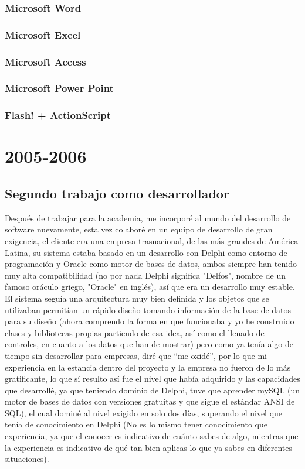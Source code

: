 \documentclass[12pt,spanish,lettersize]{book}
\begin{document}
\subsection{Microsoft Word}
\subsection{Microsoft Excel}
\subsection{Microsoft Access}
\subsection{Microsoft Power Point}
\subsection{Flash! + ActionScript}
\chapter{2005-2006}
\section{Segundo trabajo como desarrollador}

Después de trabajar para la academia, me incorporé al mundo del desarrollo de software nuevamente, esta vez colaboré en un equipo de desarrollo de gran exigencia, el cliente era una empresa trasnacional, de las más grandes de América Latina, su sistema estaba basado en un desarrollo con Delphi como entorno de programación y Oracle como motor de bases de datos, ambos siempre han tenido muy alta compatibilidad (no por nada Delphi significa "Delfos", nombre de un famoso oráculo griego, "Oracle" en inglés), así que era un desarrollo muy estable.\\

El sistema seguía una arquitectura muy bien definida y los objetos que se utilizaban permitían un rápido diseño tomando información de la base de datos para su diseño (ahora comprendo la forma en que funcionaba y yo he construido clases y bibliotecas propias partiendo de esa idea, así como el llenado de controles, en cuanto a los datos que han de mostrar) pero como ya tenía algo de tiempo sin desarrollar para empresas, diré que “me oxidé”, por lo que mi experiencia en la estancia dentro del proyecto y la empresa no fueron de lo más gratificante, lo que sí resulto así fue el nivel que había adquirido y las capacidades que desarrollé, ya que teniendo dominio de Delphi, tuve que aprender mySQL (un motor de bases de datos con versiones gratuitas y que sigue el estándar ANSI de SQL), el cual dominé al nivel exigido en solo dos días, superando el nivel que tenía de conocimiento en Delphi (No es lo mismo tener conocimiento que experiencia, ya que el conocer es indicativo de cuánto sabes de algo, mientras que la experiencia es indicativo de qué tan bien aplicas lo que ya sabes en diferentes situaciones).\\
\end{document}
